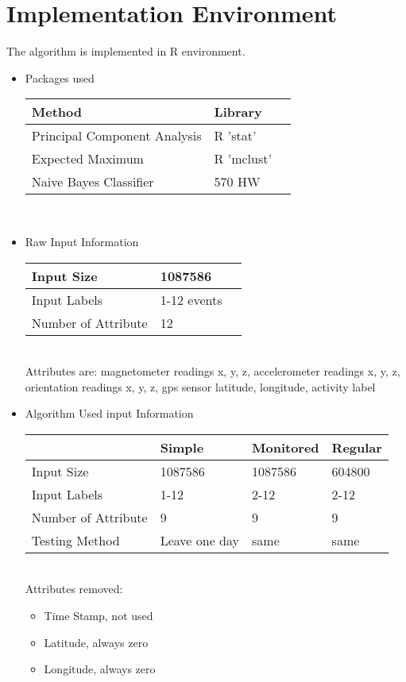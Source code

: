 \documentclass[a4paper, conference]{IEEEtran}
\begin{document}
\section{Implementation Environment}
The algorithm is implemented in R environment.
\begin {itemize}
\item Packages used \\
\begin{tabular}{|l|l|l|}
\hline \textbf{Method} & \textbf{Library} \\
\hline Principal Component Analysis & R 'stat'\\
\hline Expected Maximum & R 'mclust'\\
\hline Naive Bayes Classifier & 570 HW\\
\hline
\end {tabular}\\


\item Raw Input Information\\
\begin{tabular}{|l|l|l|}
\hline Input Size & 1087586 \\
\hline Input Labels & 1-12 events\\
\hline Number of Attribute & 12\\
\hline
\end {tabular}\\

Attributes are: magnetometer readings x, y, z, accelerometer readings x, y, z, orientation readings x, y, z, gps sensor latitude, longitude, activity label

\item Algorithm Used input Information\\
\begin{tabular}{|l|l|l|l|}
\hline &Simple & Monitored & Regular\\
\hline Input Size & 1087586 & 1087586 & 604800\\
\hline Input Labels & 1-12 & 2-12 & 2-12\\
\hline Number of Attribute & 9 & 9 & 9\\
\hline Testing Method & Leave one day& same& same\\
\hline
\end {tabular}\\

Attributes removed:
\begin {itemize}
\item Time Stamp, not used
\item Latitude, always zero
\item Longitude, always zero
\end {itemize} 
\end {itemize}
\end{document}
